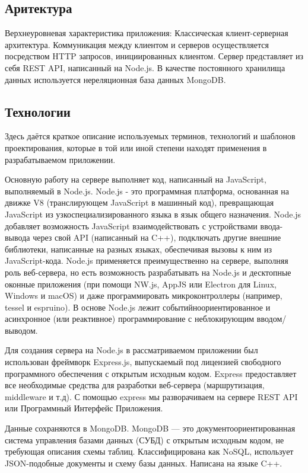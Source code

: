 \documentclass[12pt]{article}
\begin{document}
\subsection*{Аритектура}

Верхнеуровневая характеристика приложения: Классическая клиент-серверная архитектура. Коммуникация между клиентом и серверов осуществляется посредством HTTP запросов, инициированных клиентом. Сервер представляет из себя REST API, написанный на Node.js. В качестве постоянного хранилища данных используется нереляционная база данных MongoDB. 

\subsection*{Технологии}

Здесь даётся краткое описание используемых терминов, технологий и шаблонов проектирования, которые в той или иной степени находят применения в разрабатываемом приложении. 

Основную работу на сервере выполняет код, написанный на JavaScript, выполняемый в Node.js. Node.js - это программная платформа, основанная на движке V8 (транслирующем JavaScript в машинный код), превращающая JavaScript из узкоспециализированного языка в язык общего назначения. Node.js добавляет возможность JavaScript взаимодействовать с устройствами ввода-вывода через свой API (написанный на C++), подключать другие внешние библиотеки, написанные на разных языках, обеспечивая вызовы к ним из JavaScript-кода. Node.js применяется преимущественно на сервере, выполняя роль веб-сервера, но есть возможность разрабатывать на Node.js и десктопные оконные приложения (при помощи NW.js, AppJS или Electron для Linux, Windows и macOS) и даже программировать микроконтроллеры (например, tessel и espruino). В основе Node.js лежит событийноориентированное и асинхронное (или реактивное) программирование с неблокирующим вводом/выводом.

Для создания сервера на Node.js в рассматриваемом приложении был использован фреймворк Express.js, выпускаемый под лицензией свободного программного обеспечения с открытым исходным кодом. Express предоставляет все необходимые средства для разработки веб-сервера (маршрутизация, middleware и т.д). С помощью express мы разворачиваем на сервере REST API или Программный Интерфейс Приложения.

Данные сохраняются в MongoDB. MongoDB --- это документоориентированная система управления базами данных (СУБД) с открытым исходным кодом, не требующая описания схемы таблиц. Классифицирована как NoSQL, использует JSON-подобные документы и схему базы данных. Написана на языке C++.
\end{document}
